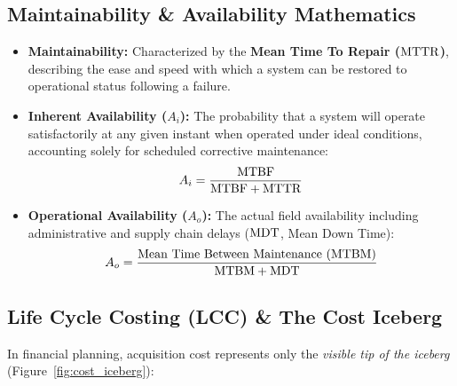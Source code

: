 \subsection{Maintainability \& Availability Mathematics}
\begin{itemize}[leftmargin=1.5em]
    \item \textbf{Maintainability:} Characterized by the \textbf{Mean Time To Repair ($\text{MTTR}$)}, describing the ease and speed with which a system can be restored to operational status following a failure.
    \item \textbf{Inherent Availability ($A_i$):} The probability that a system will operate satisfactorily at any given instant when operated under ideal conditions, accounting solely for scheduled corrective maintenance:
    \begin{equation}
        A_i = \frac{\text{MTBF}}{\text{MTBF} + \text{MTTR}}
    \end{equation}
    \item \textbf{Operational Availability ($A_o$):} The actual field availability including administrative and supply chain delays ($\text{MDT}$, Mean Down Time):
    \begin{equation}
        A_o = \frac{\text{Mean Time Between Maintenance (MTBM)}}{\text{MTBM} + \text{MDT}}
    \end{equation}
\end{itemize}

\subsection{Life Cycle Costing (LCC) \& The Cost Iceberg}
In financial planning, acquisition cost represents only the \textit{visible tip of the iceberg} (Figure~\ref{fig:cost_iceberg}):

